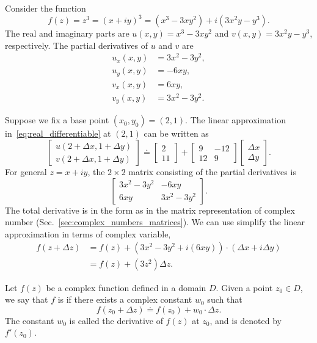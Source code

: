 \begin{example} 	\label{ex:complex_differentiation_z_cube}
	Consider the function $$f(z)=z^3 = (x+iy)^3 = (x^3-3xy^2) + i (3x^2y-y^3).$$
	The real and imaginary parts are $u(x,y) = x^3-3xy^2$ and $v(x,y) = 3x^2y-y^3$, respectively. The partial derivatives of $u$ and $v$ are
	\begin{align*}
		u_x(x,y) &= 3x^2-3y^2 ,\\
		u_y(x,y) &= -6xy, \\
		v_x(x,y) &= 6xy, \\
		v_y(x,y) &= 3x^2 -3y^2.
	\end{align*}
	
	Suppose we fix a base point $(x_0,y_0)=(2,1)$. The linear approximation in~\eqref{eq:real_differentiable} at $(2,1)$ can be written as
	$$
	\begin{bmatrix}u(2+\Delta x, 1+\Delta y) \\ v(2+\Delta x, 1 + \Delta y) \end{bmatrix}
	\doteq
	\begin{bmatrix}2\\11 \end{bmatrix} +
	\begin{bmatrix} 9&-12 \\ 12 &9 \end{bmatrix}
	\begin{bmatrix} \Delta x \\ \Delta y \end{bmatrix}.
	$$
	For general $z=x+iy$, the $2\times 2$ matrix consisting of the partial derivatives is
	$$
	\begin{bmatrix}
		3x^2-3y^2 & -6xy \\ 6xy & 3x^2-3y^2
	\end{bmatrix}.
	$$
	The total derivative is in the form as in the matrix representation of complex number (Sec.~\ref{sec:complex_numbers_matrices}). 
	We can use simplify the linear approximation in terms of complex variable,
	\begin{align*}
		f(z+\Delta z) &= f(z) + (3x^2-3y^2 +i(6xy))\cdot (\Delta x + i \Delta y) \\
		&= f(z) + (3z^2)\Delta z.
	\end{align*}
\end{example}

\begin{svgraybox}
\begin{definition}  	\label{def:complex_differentiable} Let $f(z)$ be a complex function defined in a domain $D$. Given a point $z_0\in D$, we say that $f$ is  if there exists a complex constant $w_0$ such that 
	\begin{equation}
	f(z_0 + \Delta z) \doteq f(z_0) + w_0 \cdot \Delta z.
	\label{eq:complex_derivative1}
\end{equation}	
The constant $w_0$ is called the derivative of $f(z)$ at $z_0$, and is denoted by $f'(z_0)$.
\end{definition}
\end{svgraybox}

